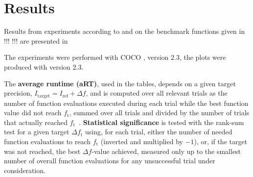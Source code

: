 \documentclass[sigconf]{acmart}
\newcommand{\Df}{\ensuremath{\Delta f}}
\newcommand{\ftarget}{\ensuremath{f_\mathrm{t}}}
\newcommand{\Itarget}{\ensuremath{I_\mathrm{target}}}
\newcommand{\hvref}{\ensuremath{I_\mathrm{ref}}}
\newcommand{\fopt}{\hvref}
\newcommand{\change}[1]{{\color{red} #1}}
\newcommand{\TODO}[1]{{\color{orange} !!! #1 !!!}}
\begin{document}
\section{Results}

Results from experiments according to \cite{hansen2016exp} and
\cite{hansen2016perfass} on the benchmark functions given in 
\TODO{\cite{tusar2019}} are presented in


The experiments were performed with COCO \cite{hansen2016cocoplat}, version
\change{2.3}, the plots were produced with version \change{2.3}.

The \textbf{average runtime (aRT)}, used in the %
tables,
depends on a given target precision, $\Itarget=\fopt+\Df$, and is
computed over all relevant trials as the number of function
evaluations executed during each trial while the best function value
did not reach \ftarget, summed over all trials and divided by the
number of trials that actually reached \ftarget\
\cite{hansen2016exp,price1997dev}.
\textbf{Statistical significance} is tested with the rank-sum test for a given
target $\Delta\ftarget$ using, for each trial,
either the number of needed function evaluations to reach
$\ftarget$ (inverted and multiplied by $-1$), or, if the target
was not reached, the best $\Df$-value achieved, measured only up to
the smallest number of overall function evaluations for any
unsuccessful trial under consideration.
\end{document}
